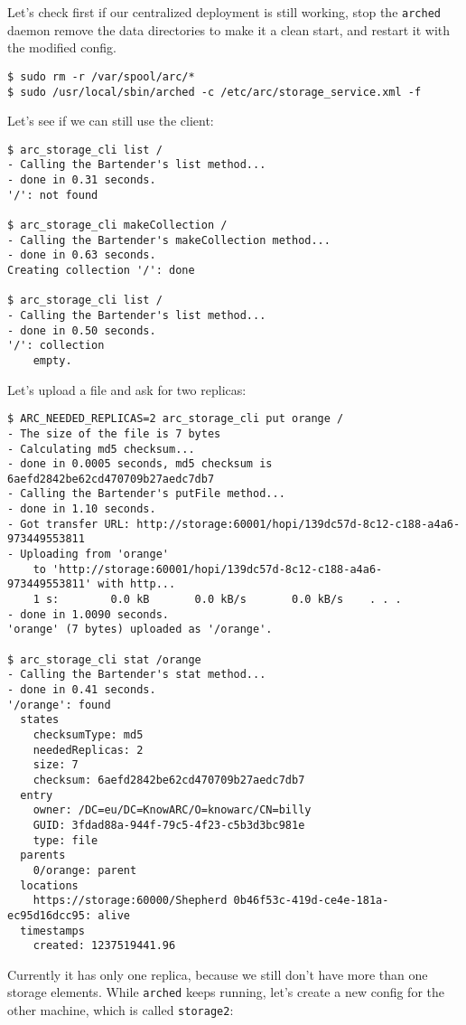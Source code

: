 \documentclass{book}
\begin{document}
Let's check first if our centralized deployment is still working, stop the \verb!arched! daemon remove the data directories to make it a clean start, and restart it with the modified config.

\begin{verbatim}
$ sudo rm -r /var/spool/arc/*
$ sudo /usr/local/sbin/arched -c /etc/arc/storage_service.xml -f    
\end{verbatim}

Let's see if we can still use the client:

\begin{verbatim}
$ arc_storage_cli list /
- Calling the Bartender's list method...
- done in 0.31 seconds.
'/': not found

$ arc_storage_cli makeCollection /
- Calling the Bartender's makeCollection method...
- done in 0.63 seconds.
Creating collection '/': done

$ arc_storage_cli list /
- Calling the Bartender's list method...
- done in 0.50 seconds.
'/': collection
    empty.
\end{verbatim}

Let's upload a file and ask for two replicas:

\begin{verbatim}
$ ARC_NEEDED_REPLICAS=2 arc_storage_cli put orange /
- The size of the file is 7 bytes
- Calculating md5 checksum...
- done in 0.0005 seconds, md5 checksum is 6aefd2842be62cd470709b27aedc7db7
- Calling the Bartender's putFile method...
- done in 1.10 seconds.
- Got transfer URL: http://storage:60001/hopi/139dc57d-8c12-c188-a4a6-973449553811
- Uploading from 'orange'
    to 'http://storage:60001/hopi/139dc57d-8c12-c188-a4a6-973449553811' with http...
    1 s:        0.0 kB       0.0 kB/s       0.0 kB/s    . . .       
- done in 1.0090 seconds.
'orange' (7 bytes) uploaded as '/orange'.

$ arc_storage_cli stat /orange
- Calling the Bartender's stat method...
- done in 0.41 seconds.
'/orange': found
  states
    checksumType: md5
    neededReplicas: 2
    size: 7
    checksum: 6aefd2842be62cd470709b27aedc7db7
  entry
    owner: /DC=eu/DC=KnowARC/O=knowarc/CN=billy
    GUID: 3fdad88a-944f-79c5-4f23-c5b3d3bc981e
    type: file
  parents
    0/orange: parent
  locations
    https://storage:60000/Shepherd 0b46f53c-419d-ce4e-181a-ec95d16dcc95: alive
  timestamps
    created: 1237519441.96
\end{verbatim}

Currently it has only one replica, because we still don't have more than one storage elements. While \verb!arched! keeps running, let's create a new config for the other machine, which is called \verb!storage2!:
\end{document}
